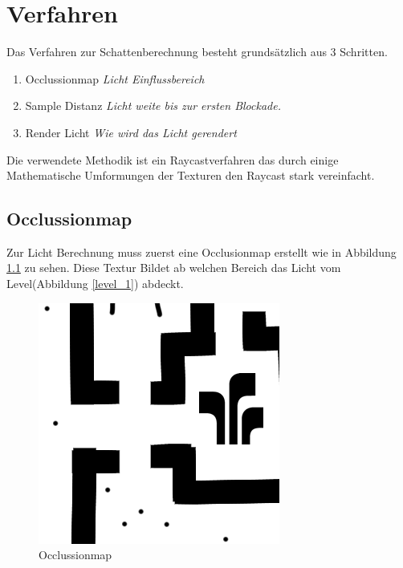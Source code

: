 \chapter{Verfahren}
Das Verfahren zur Schattenberechnung besteht grundsätzlich aus 3 Schritten.
\begin{enumerate}
	\item Occlussionmap
			\textit{Licht Einflussbereich}
	\item Sample Distanz
			\textit{Licht weite bis zur ersten Blockade.}
	\item Render Licht
			\textit{Wie wird das Licht gerendert}
\end{enumerate}
Die verwendete Methodik ist ein Raycastverfahren das durch einige Mathematische Umformungen der Texturen den Raycast stark vereinfacht.

\section{Occlussionmap}
Zur Licht Berechnung muss zuerst eine Occlusionmap erstellt wie in Abbildung \ref{o_1} zu sehen. Diese Textur Bildet ab welchen Bereich das Licht vom Level(Abbildung \ref{level_1}) abdeckt. 
\begin{figure}[h]
	\centering
	\includegraphics{images/oclusion.png}
	\caption{Occlussionmap}
	\label{o_1}
\end{figure}
